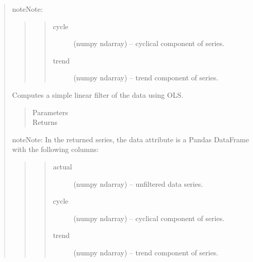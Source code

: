 \documentclass[letterpaper,10pt,english]{sphinxmanual}
\begin{document}
\begin{fulllineitems}
\begin{quote}
\begin{fulllineitems}
\begin{notice}{note}{Note:}
\begin{quote}
\begin{quote}
\begin{description}
\item[{cycle}] \leavevmode
(numpy ndarray) --  cyclical component of series.

\item[{trend}] \leavevmode
(numpy ndarray) --  trend component of series.

\end{description}\end{quote}
\end{quote}
\end{notice}

\end{fulllineitems}


\begin{fulllineitems}
\label{series_class:fredpy.series.lintrend}
Computes a simple linear filter of the data using OLS.
\begin{quote}\begin{description}
\item[{Parameters}] \leavevmode
\item[{Returns}] \leavevmode
{\hyperref[series_class:fredpy.series]{}}

\end{description}\end{quote}

\begin{notice}{note}{Note:}
In the returned series, the data attribute is a Pandas DataFrame with the following columns:
\begin{quote}
\begin{quote}\begin{description}
\item[{actual}] \leavevmode
(numpy ndarray) --  unfiltered data series.

\item[{cycle}] \leavevmode
(numpy ndarray) --  cyclical component of series.

\item[{trend}] \leavevmode
(numpy ndarray) --  trend component of series.

\end{description}\end{quote}
\end{quote}
\end{notice}

\end{fulllineitems}


\end{quote}
\end{fulllineitems}
\end{document}
